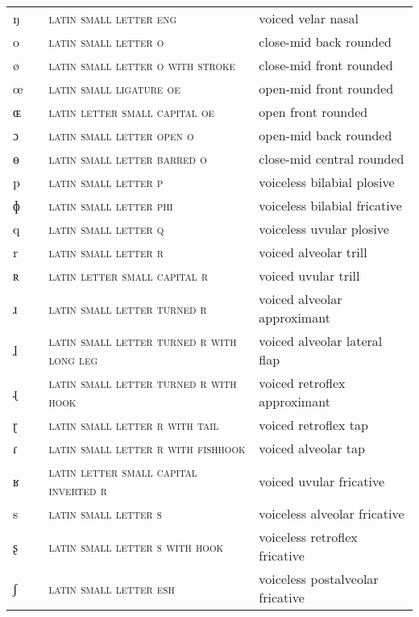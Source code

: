 \begin{center}
\begin{xtabular}{ l L{1.1cm} L{5.4cm} L{4.2cm} }
ŋ &  & \textsc{latin small letter eng} & voiced velar nasal \\ 
o &  & \textsc{latin small letter o} & close-mid back rounded \\ 
ø &  & \textsc{latin small letter o with stroke} & close-mid front rounded \\ 
œ &  & \textsc{latin small ligature oe} & open-mid front rounded \\ 
ɶ &  & \textsc{latin letter small capital oe} & open front rounded \\ 
ɔ &  & \textsc{latin small letter open o} & open-mid back rounded \\ 
ɵ &  & \textsc{latin small letter barred o} & close-mid central rounded \\ 
p &  & \textsc{latin small letter p} & voiceless bilabial plosive \\ 
ɸ &  & \textsc{latin small letter phi} & voiceless bilabial fricative \\ 
q &  & \textsc{latin small letter q} & voiceless uvular plosive \\ 
r &  & \textsc{latin small letter r} & voiced alveolar trill \\ 
ʀ &  & \textsc{latin letter small capital r} & voiced uvular trill \\ 
ɹ &  & \textsc{latin small letter turned r} & voiced alveolar approximant \\ 
ɺ &  & \textsc{latin small letter turned r with long leg} & voiced alveolar lateral flap \\ 
ɻ &  & \textsc{latin small letter turned r with hook} & voiced retroflex approximant \\ 
ɽ &  & \textsc{latin small letter r with tail} & voiced retroflex tap \\ 
ɾ &  & \textsc{latin small letter r with fishhook} & voiced alveolar tap \\ 
ʁ &  & \textsc{latin letter small capital inverted r} & voiced uvular fricative \\ 
s &  & \textsc{latin small letter s} & voiceless alveolar fricative \\ 
ʂ &  & \textsc{latin small letter s with hook} & voiceless retroflex fricative \\ 
ʃ &  & \textsc{latin small letter esh} & voiceless postalveolar fricative \\ 

\end{xtabular}
\end{center}
